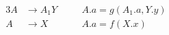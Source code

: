 
\begin{alignat*}{3}
  A &\to A_{1} Y \quad && A.a = g(A_{1}.a, Y.y) \\[8pt]
  A &\to X && A.a = f(X.x)
\end{alignat*}